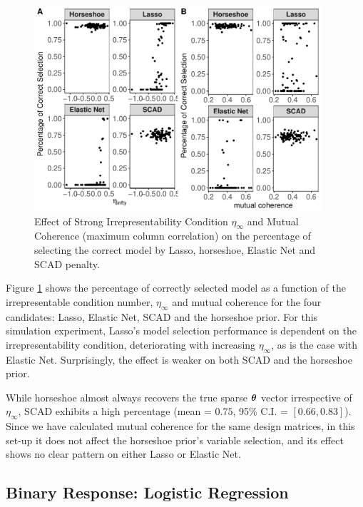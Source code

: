 \documentclass[sts,preprint]{imsart}
\begin{document}
\begin{figure}[ht!]%
\centering
\includegraphics[height=3in,width=0.9\columnwidth]{irrep_mc_effect_all_100_100}%
\caption{Effect of Strong Irrepresentability Condition $\eta_{\infty}$ and Mutual Coherence
(maximum column correlation) on the percentage of selecting the correct model
by Lasso, horseshoe, Elastic Net and SCAD penalty.}%
\label{fig:irrep-mc}%
\end{figure}

Figure \ref{fig:irrep-mc} shows the percentage of correctly selected model as a function of the irrepresentable condition number, $\eta_{\infty}$ and mutual coherence  for the four candidates: Lasso, Elastic Net, SCAD and the horseshoe prior. For this simulation experiment, Lasso's model selection performance is dependent on the irrepresentability condition, deteriorating with increasing $\eta_{\infty}$, as is the case with Elastic Net. Surprisingly, the effect is weaker on both SCAD and the horseshoe prior. 

While horseshoe almost always recovers the true sparse $\boldsymbol{\theta}$ vector irrespective of $\eta_{\infty}$, SCAD exhibits a high percentage (mean = $0.75$, 95\% C.I. = $[0.66, 0.83]$). Since we have calculated mutual coherence for the same design matrices, in this set-up it does not affect the horseshoe prior's variable selection, and its effect shows no clear pattern on either Lasso or Elastic Net. 

\subsection{Binary Response: Logistic Regression}
\end{document}
